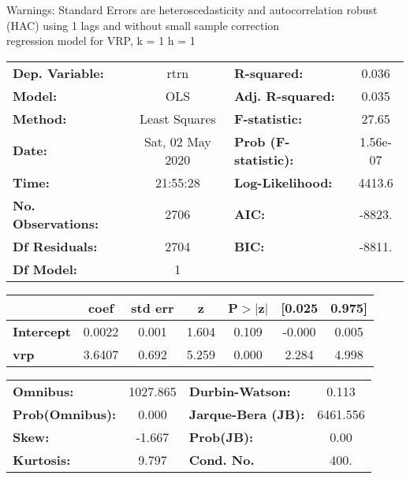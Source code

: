 Warnings: \newline
 [1] Standard Errors are heteroscedasticity and autocorrelation robust (HAC) using 1 lags and without small sample correction\\ 

regression model for VRP, k = 1 h = 1\begin{center}
\begin{tabular}{lclc}
\toprule
\textbf{Dep. Variable:}    &       rtrn       & \textbf{  R-squared:         } &     0.036   \\
\textbf{Model:}            &       OLS        & \textbf{  Adj. R-squared:    } &     0.035   \\
\textbf{Method:}           &  Least Squares   & \textbf{  F-statistic:       } &     27.65   \\
\textbf{Date:}             & Sat, 02 May 2020 & \textbf{  Prob (F-statistic):} &  1.56e-07   \\
\textbf{Time:}             &     21:55:28     & \textbf{  Log-Likelihood:    } &    4413.6   \\
\textbf{No. Observations:} &        2706      & \textbf{  AIC:               } &    -8823.   \\
\textbf{Df Residuals:}     &        2704      & \textbf{  BIC:               } &    -8811.   \\
\textbf{Df Model:}         &           1      & \textbf{                     } &             \\
\bottomrule
\end{tabular}
\begin{tabular}{lcccccc}
                   & \textbf{coef} & \textbf{std err} & \textbf{z} & \textbf{P$> |$z$|$} & \textbf{[0.025} & \textbf{0.975]}  \\
\midrule
\textbf{Intercept} &       0.0022  &        0.001     &     1.604  &         0.109        &       -0.000    &        0.005     \\
\textbf{vrp}       &       3.6407  &        0.692     &     5.259  &         0.000        &        2.284    &        4.998     \\
\bottomrule
\end{tabular}
\begin{tabular}{lclc}
\textbf{Omnibus:}       & 1027.865 & \textbf{  Durbin-Watson:     } &    0.113  \\
\textbf{Prob(Omnibus):} &   0.000  & \textbf{  Jarque-Bera (JB):  } & 6461.556  \\
\textbf{Skew:}          &  -1.667  & \textbf{  Prob(JB):          } &     0.00  \\
\textbf{Kurtosis:}      &   9.797  & \textbf{  Cond. No.          } &     400.  \\
\bottomrule
\end{tabular}
\end{center}

